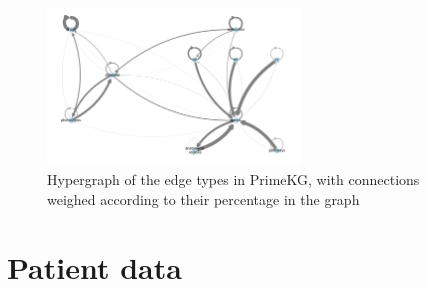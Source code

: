 \begin{figure}
    \centering
    \includegraphics[width=0.6\textwidth]{figs/primekg_edge_types_perc_on_type.png}
    \caption{Hypergraph of the edge types in PrimeKG, with connections weighed according to their percentage in the graph}
    \label{fig:primekg_edge_types_hypergraph_perc_on_type}
\end{figure}

% 



\section{Patient data}\label{data_sources:patient_data}